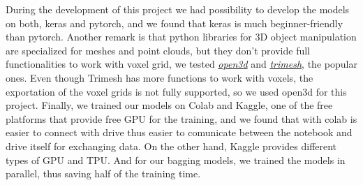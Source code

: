 During the development of this project we had possibility to develop the models on both, keras and pytorch, and we found that keras is much beginner-friendly than pytorch.
Another remark is that python libraries for 3D object manipulation are specialized for meshes and point clouds, but they don't provide full functionalities to work with voxel grid, we tested \textit{\href{http://www.open3d.org/}{open3d}} and  \textit{\href{https://trimsh.org/index.html}{trimesh}}, the popular ones. Even though Trimesh has more functions to work with voxels, the exportation of the voxel grids is not fully supported, so we used open3d for this project.
Finally, we trained our models on Colab and Kaggle, one of the free platforms that provide free GPU for the training, and we found that with colab is easier to connect with drive thus easier to comunicate between the notebook and drive itself for exchanging data. On the other hand, Kaggle provides different types of GPU and TPU. And for our bagging models, we trained the models in parallel, thus saving half of the training time.
